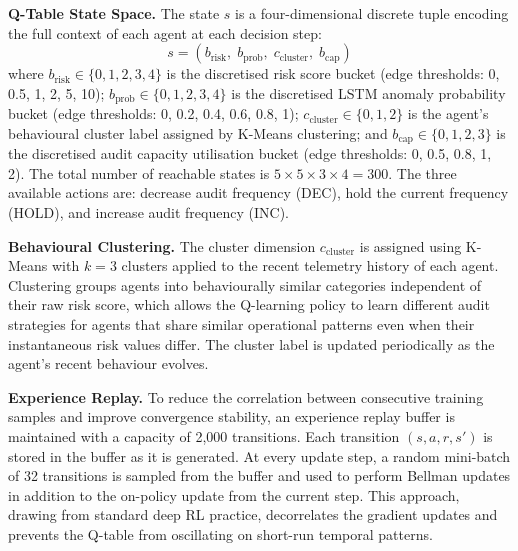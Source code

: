 \par \vspace{0.35cm}
\noindent
\textbf{Q-Table State Space.} The state $s$ is a four-dimensional discrete tuple encoding the full context of each agent at each decision step:
\begin{equation}
s = \left( b_{\text{risk}},\; b_{\text{prob}},\; c_{\text{cluster}},\; b_{\text{cap}} \right)
\label{eq:rl_state}
\end{equation}
where $b_{\text{risk}} \in \{0,1,2,3,4\}$ is the discretised risk score bucket (edge thresholds: 0, 0.5, 1, 2, 5, 10); $b_{\text{prob}} \in \{0,1,2,3,4\}$ is the discretised LSTM anomaly probability bucket (edge thresholds: 0, 0.2, 0.4, 0.6, 0.8, 1); $c_{\text{cluster}} \in \{0,1,2\}$ is the agent's behavioural cluster label assigned by K-Means clustering; and $b_{\text{cap}} \in \{0,1,2,3\}$ is the discretised audit capacity utilisation bucket (edge thresholds: 0, 0.5, 0.8, 1, 2). The total number of reachable states is $5 \times 5 \times 3 \times 4 = 300$. The three available actions are: decrease audit frequency (\textsc{DEC}), hold the current frequency (\textsc{HOLD}), and increase audit frequency (\textsc{INC}).

\par \vspace{0.25cm}
\noindent
\textbf{Behavioural Clustering.} The cluster dimension $c_{\text{cluster}}$ is assigned using K-Means with $k = 3$ clusters applied to the recent telemetry history of each agent. Clustering groups agents into behaviourally similar categories independent of their raw risk score, which allows the Q-learning policy to learn different audit strategies for agents that share similar operational patterns even when their instantaneous risk values differ. The cluster label is updated periodically as the agent's recent behaviour evolves.

\par \vspace{0.35cm}
\noindent
\textbf{Experience Replay.} To reduce the correlation between consecutive training samples and improve convergence stability, an experience replay buffer is maintained with a capacity of 2{,}000 transitions. Each transition $(s, a, r, s')$ is stored in the buffer as it is generated. At every update step, a random mini-batch of 32 transitions is sampled from the buffer and used to perform Bellman updates in addition to the on-policy update from the current step. This approach, drawing from standard deep RL practice, decorrelates the gradient updates and prevents the Q-table from oscillating on short-run temporal patterns.

